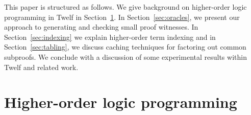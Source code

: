 \documentclass{llncs}
\begin{document}




This paper is structured as follows. We give background on
higher-order logic programming in Twelf in Section~\ref{sec:twelf}. In
Section~\ref{sec:oracles}, we present our approach to generating and
checking small proof witnesses. In Section~\ref{sec:indexing} we explain 
higher-order term indexing and in Section~\ref{sec:tabling}, we
discuss caching techniques for factoring out common subproofs. We
conclude with a discussion of some experimental results within Twelf
and  related work.

\section{Higher-order logic programming}\label{sec:twelf}

\end{document}

